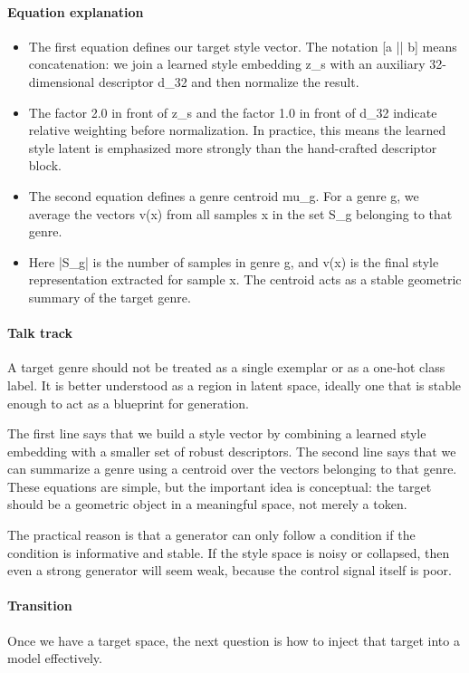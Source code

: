 \documentclass[11pt]{article}
\begin{document}
\paragraph{Equation explanation}
\begin{itemize}
\item The first equation defines our target style vector. The notation [a || b] means concatenation: we join a learned style embedding z\_s with an auxiliary 32-dimensional descriptor d\_32 and then normalize the result.
\item The factor 2.0 in front of z\_s and the factor 1.0 in front of d\_32 indicate relative weighting before normalization. In practice, this means the learned style latent is emphasized more strongly than the hand-crafted descriptor block.
\item The second equation defines a genre centroid mu\_g. For a genre g, we average the vectors v(x) from all samples x in the set S\_g belonging to that genre.
\item Here |S\_g| is the number of samples in genre g, and v(x) is the final style representation extracted for sample x. The centroid acts as a stable geometric summary of the target genre.
\end{itemize}
\paragraph{Talk track}
A target genre should not be treated as a single exemplar or as a one-hot class label. It is better understood as a region in latent space, ideally one that is stable enough to act as a blueprint for generation.

The first line says that we build a style vector by combining a learned style embedding with a smaller set of robust descriptors. The second line says that we can summarize a genre using a centroid over the vectors belonging to that genre. These equations are simple, but the important idea is conceptual: the target should be a geometric object in a meaningful space, not merely a token.

The practical reason is that a generator can only follow a condition if the condition is informative and stable. If the style space is noisy or collapsed, then even a strong generator will seem weak, because the control signal itself is poor.

\paragraph{Transition}
Once we have a target space, the next question is how to inject that target into a model effectively.
\end{document}
